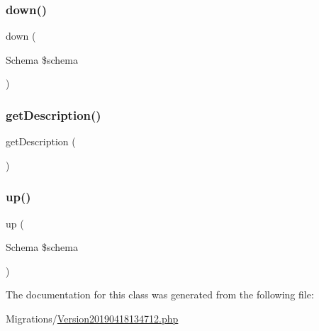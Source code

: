 \subsubsection{\texorpdfstring{down()}{down()}}
{\footnotesize\ttfamily down (\begin{DoxyParamCaption}\item[{Schema}]{\$schema }\end{DoxyParamCaption})}

\mbox{\label{class_doctrine_migrations_1_1_version20190418134712_a2e7bb35c71bf1824456ceb944cb7a845}} 
\subsubsection{\texorpdfstring{getDescription()}{getDescription()}}
{\footnotesize\ttfamily get\+Description (\begin{DoxyParamCaption}{ }\end{DoxyParamCaption})}

\mbox{\label{class_doctrine_migrations_1_1_version20190418134712_a23eb1c1428e8ea2ab2cf798fc06ec421}} 
\subsubsection{\texorpdfstring{up()}{up()}}
{\footnotesize\ttfamily up (\begin{DoxyParamCaption}\item[{Schema}]{\$schema }\end{DoxyParamCaption})}



The documentation for this class was generated from the following file\+:\begin{DoxyCompactItemize}
\item 
Migrations/\mbox{\hyperlink{_version20190418134712_8php}{Version20190418134712.\+php}}\end{DoxyCompactItemize}
